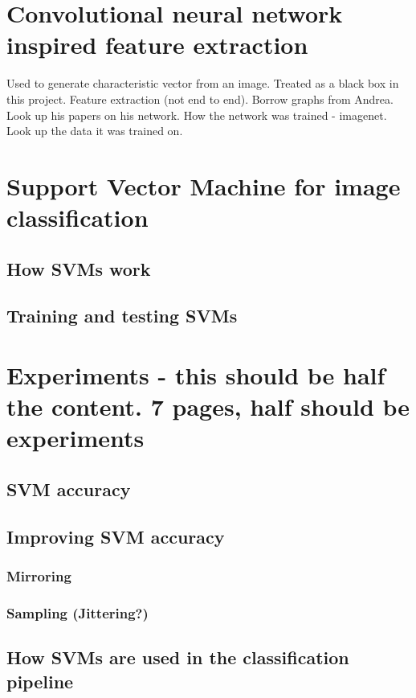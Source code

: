 \documentclass[11pt, a4paper]{report}
\begin{document}
\section{Convolutional neural network inspired feature extraction}
Used to generate characteristic vector from an image. Treated as a black box in this project. Feature extraction (not end to end). Borrow graphs from Andrea. Look up his papers on his network. How the network was trained - imagenet. Look up the data it was trained on. 

\section{Support Vector Machine for image classification}

\subsection{How SVMs work}

\subsection{Training and testing SVMs}


\section{Experiments - this should be half the content. 7 pages, half should be experiments}

\subsection{SVM accuracy}

\subsection{Improving SVM accuracy}

\subsubsection{Mirroring}

\subsubsection{Sampling (Jittering?)}

\subsection{How SVMs are used in the classification pipeline}
\end{document}
